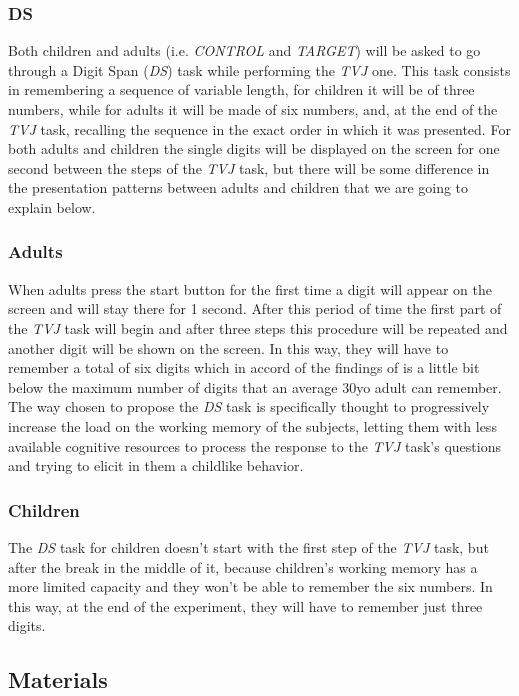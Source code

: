\documentclass[10pt, a4]{article}
\begin{document}
\subsubsection{DS}
Both children and adults (i.e. \textit{CONTROL} and \textit{TARGET}) will be asked to go through a Digit Span (\textit{DS}) task
while performing the \textit{TVJ} one. This task consists in remembering a sequence of variable length, for children it will be of three numbers,
while for adults it will be made of six numbers, and, at the end of the \textit{TVJ} task, recalling the sequence in the exact order
in which it was presented. For both adults and children the single digits will be displayed on the screen for one second between the steps of the
\textit{TVJ} task, but there will be some difference in the presentation patterns between adults and children that we are going to explain below.

\subsubsection{Adults}
When adults press the start button for the first time a digit will appear on the screen and will stay there for 1 second. After this period of time the first part of the \textit{TVJ}
task will begin and after three steps this procedure will be repeated and another digit will be shown on the screen.
In this way, they will have to remember a total of six digits which in accord of the findings of \cite{taub1972comparison}
is a little bit below the maximum number of digits that an average 30yo adult can remember. The way chosen to propose the \textit{DS} task is specifically
thought to progressively increase the load on the working memory of the subjects, letting them with less available cognitive resources
to process the response to the \textit{TVJ} task's questions and trying to elicit in them a childlike behavior.

\subsubsection{Children}
The \textit{DS} task for children doesn't start with the first step of the \textit{TVJ} task, but after the break in the middle of it,
because children's working memory has a more limited capacity and they won't be able to remember the six numbers.
In this way, at the end of the experiment, they will have to remember just three digits.


\subsection{Materials}
\end{document}
